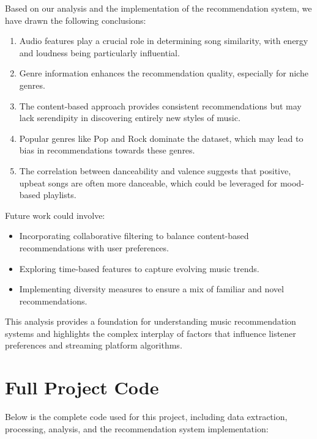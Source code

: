 \documentclass[runningheads]{llncs}
\begin{document}
Based on our analysis and the implementation of the recommendation system, we have drawn the following conclusions:

\begin{enumerate}
    \item Audio features play a crucial role in determining song similarity, with energy and loudness being particularly influential.
    \item Genre information enhances the recommendation quality, especially for niche genres.
    \item The content-based approach provides consistent recommendations but may lack serendipity in discovering entirely new styles of music.
    \item Popular genres like Pop and Rock dominate the dataset, which may lead to bias in recommendations towards these genres.
    \item The correlation between danceability and valence suggests that positive, upbeat songs are often more danceable, which could be leveraged for mood-based playlists.
\end{enumerate}

Future work could involve:
\begin{itemize}
    \item Incorporating collaborative filtering to balance content-based recommendations with user preferences.
    \item Exploring time-based features to capture evolving music trends.
    \item Implementing diversity measures to ensure a mix of familiar and novel recommendations.
\end{itemize}

This analysis provides a foundation for understanding music recommendation systems and highlights the complex interplay of factors that influence listener preferences and streaming platform algorithms.

\section{Full Project Code}

Below is the complete code used for this project, including data extraction, processing, analysis, and the recommendation system implementation:
\end{document}
